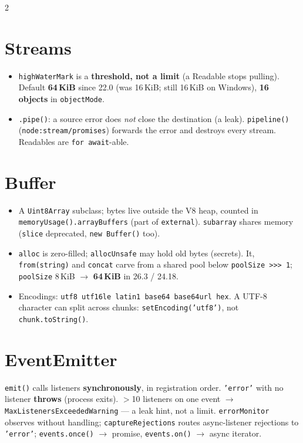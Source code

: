 \documentclass[8pt]{extarticle}
\newcommand\ct[1]{\texttt{#1}}
\newcommand\ush{\hbox{>}\hbox{>}\hbox{>}}
\begin{document}
\begin{multicols}{2}
\section{Streams}
\begin{itemize}
  \item \ct{highWaterMark} is a \textbf{threshold, not a limit} (a Readable stops pulling).
        Default \textbf{64\,KiB} since 22.0 (was 16\,KiB; still 16\,KiB on Windows),
        \textbf{16 objects} in \ct{objectMode}.
  \item \ct{.pipe()}: a source error does \emph{not} close the destination (a leak).
        \ct{pipeline()} (\ct{node:stream/promises}) forwards the error and destroys every
        stream. Readables are \ct{for await}-able.
\end{itemize}

\section{Buffer}
\begin{itemize}
  \item A \ct{Uint8Array} subclass; bytes live outside the V8 heap, counted in
        \ct{memoryUsage().arrayBuffers} (part of \ct{external}). \ct{subarray} shares memory
        (\ct{slice} deprecated, \ct{new Buffer()} too).
  \item \ct{alloc} is zero-filled; \ct{allocUnsafe} may hold old bytes (secrets). It,
        \ct{from(string)} and \ct{concat} carve from a shared pool below
        \ct{poolSize~\ush{}~1}; \ct{poolSize} 8\,KiB $\to$ \textbf{64\,KiB} in 26.3 / 24.18.
  \item Encodings: \ct{utf8 utf16le latin1 base64 base64url hex}. A UTF-8 character can split
        across chunks: \ct{setEncoding('utf8')}, not \ct{chunk.toString()}.
\end{itemize}

\section{EventEmitter}
\ct{emit()} calls listeners \textbf{synchronously}, in registration order. \ct{'error'} with no
listener \textbf{throws} (process exits). $>$10 listeners on one event $\to$
\ct{MaxListenersExceededWarning} — a leak hint, not a limit. \ct{errorMonitor} observes without
handling; \ct{captureRejections} routes async-listener rejections to \ct{'error'};
\ct{events.once()} $\to$ promise, \ct{events.on()} $\to$ async iterator.


\end{multicols}
\end{document}
